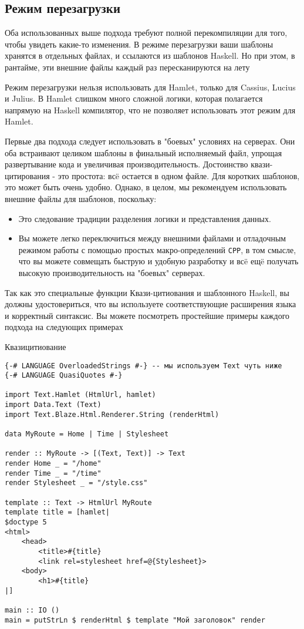 \subsection {Режим перезагрузки}
Оба использованных выше подхода требуют полной перекомпиляции для того, чтобы увидеть
какие-то изменения. В режиме перезагрузки ваши шаблоны хранятся в отдельных файлах,
и ссылаются из шаблонов Haskell. Но при этом, в рантайме, эти внешние файлы 
каждый раз пересканируются на лету

Режим перезагрузки нельзя использовать для Hamlet, только для Cassius, Lucius и Julius.
В Hamlet слишком много сложной логики, которая полагается напрямую на Haskell
компилятор, что не позволяет использовать этот режим для Hamlet.

Первые два подхода следует использовать в "боевых" условиях на серверах.
Они оба встраивают целиком шаблоны в финальный исполняемый файл, упрощая 
развертывание кода и увеличивая производительность.
Достоинство квази-цитирования - это простота: всë остается в одном файле.
Для коротких шаблонов, это может быть очень удобно. Однако, в целом, мы рекомендуем
использовать внешние файлы для шаблонов, поскольку:

\begin{itemize}
\item Это следование традиции разделения логики и представления данных.
\item Вы можете легко переключиться между внешними файлами и отладочным режимом
работы с помощью простых макро-определений \texttt{CPP}, в том смысле, что вы
можете совмещать быструю и удобную разработку и всë ещë получать высокую
производительность на "боевых" серверах.
\end{itemize}

Так как это специальные функции Квази-цитиования и шаблонного Haskell, вы 
должны удостовериться, что вы используете соответствующие расширения языка
и корректный синтаксис. Вы можете посмотреть простейшие примеры каждого подхода
на следующих примерах

Квазицитиование
\begin{lstlisting}
{-# LANGUAGE OverloadedStrings #-} -- мы используем Text чуть ниже
{-# LANGUAGE QuasiQuotes #-}

import Text.Hamlet (HtmlUrl, hamlet)
import Data.Text (Text)
import Text.Blaze.Html.Renderer.String (renderHtml)

data MyRoute = Home | Time | Stylesheet

render :: MyRoute -> [(Text, Text)] -> Text
render Home _ = "/home"
render Time _ = "/time"
render Stylesheet _ = "/style.css"

template :: Text -> HtmlUrl MyRoute
template title = [hamlet|
$doctype 5
<html>
    <head>
        <title>#{title}
        <link rel=stylesheet href=@{Stylesheet}>
    <body>
        <h1>#{title}
|]

main :: IO ()
main = putStrLn $ renderHtml $ template "Мой заголовок" render
\end{lstlisting}

